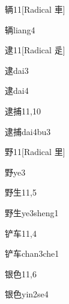 \begin{entry}{辆}{11}[Radical 車]
  \begin{phonetics}{辆}{liang4}
  \end{phonetics}
\end{entry}

\begin{entry}{逮}{11}[Radical 辵]
  \begin{phonetics}{逮}{dai3}
  \end{phonetics}
  \begin{phonetics}{逮}{dai4}
  \end{phonetics}
\end{entry}

\begin{entry}{逮捕}{11,10}
  \begin{phonetics}{逮捕}{dai4bu3}
  \end{phonetics}
\end{entry}

\begin{entry}{野}{11}[Radical 里]
  \begin{phonetics}{野}{ye3}
  \end{phonetics}
\end{entry}

\begin{entry}{野生}{11,5}
  \begin{phonetics}{野生}{ye3sheng1}
  \end{phonetics}
\end{entry}

\begin{entry}{铲车}{11,4}
  \begin{phonetics}{铲车}{chan3che1}
  \end{phonetics}
\end{entry}

\begin{entry}{银色}{11,6}
  \begin{phonetics}{银色}{yin2se4}
  \end{phonetics}
\end{entry}

